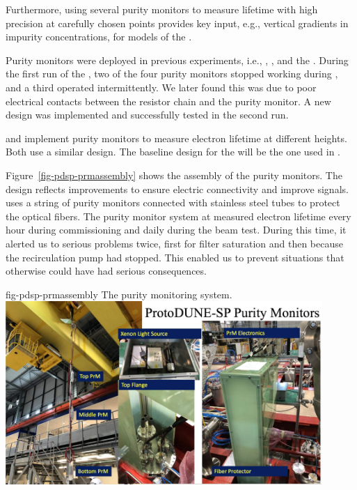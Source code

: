 Furthermore, using several purity monitors to measure lifetime with high precision at carefully chosen points provides key input, e.g.,  vertical gradients in impurity concentrations, for  models of the .

Purity monitors were deployed in previous  experiments, i.e., , \microboone, and the . During the first run of the , two of the four purity monitors stopped working during \cooldown, and a third operated intermittently. We later found this was due to poor electrical contacts between the resistor chain and the purity monitor. A new design was implemented and successfully tested in the second run. 



 and  %
implement purity monitors to %
measure electron lifetime at different heights.  
Both use a similar design. The baseline design for the   will be the one used in .
 
Figure~\ref{fig-pdsp-prmassembly} shows the assembly of the  purity monitors. The design reflects improvements to ensure electric connectivity and improve signals.  uses a string of purity monitors connected with stainless steel tubes to protect the optical fibers. The purity monitor system at  measured electron lifetime every hour during commissioning and daily during the beam test. During %
this time, it %
alerted us to serious problems twice, first %
for filter saturation and %
then because the recirculation pump had stopped. This enabled us to prevent %
situations that otherwise could have had serious consequences.

\begin{dunefigure}{fig-pdsp-prmassembly}
  {The  purity monitoring system.}
  \includegraphics[width=0.9\textwidth]{graphics/PrMon_pdsp-PrMAssembly}
\end{dunefigure}



